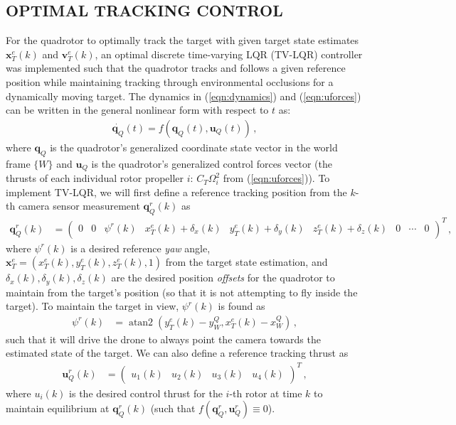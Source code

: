 \documentclass[11pt]{article}
\DeclareMathOperator{\atantwo}{atan2}
\begin{document}
\subsection{OPTIMAL TRACKING CONTROL}
For the quadrotor to optimally track the target with given target state estimates $\mathbf x_T^e(k)$ and $\mathbf v_T^e(k)$, an optimal discrete time-varying LQR (TV-LQR) controller was implemented such that the quadrotor tracks and follows a given reference position while maintaining tracking through environmental occlusions for a dynamically moving target. The dynamics in (\ref{eqn:dynamics}) and (\ref{eqn:uforces}) can be written in the general nonlinear form with respect to $t$ as:
\begin{align}\label{eqn:qdyn}
    \dot{\mathbf q_Q}(t)=f(\mathbf q_Q(t),\mathbf u_Q(t))\,,
\end{align}
where $\mathbf q_Q$ is the quadrotor's generalized coordinate state vector in the world frame $\{W\}$ and $\mathbf u_Q$ is the quadrotor's generalized control forces vector (the thrusts of each individual rotor propeller $i$: $C_T\Omega_i^2$ from (\ref{eqn:uforces})). To implement TV-LQR, we will first define a reference tracking position from the $k$-th camera sensor measurement $\mathbf q_Q^r(k)$ as
\begin{align}\label{eqn:qr}
    \mathbf q_Q^r(k)&=\begin{pmatrix}
        0 & 0 & \psi^r(k) & x_T^e(k)+\delta_x(k) & y_T^e(k)+\delta_y(k) & z_T^e(k)+\delta_z(k) & 0 & \cdots & 0
    \end{pmatrix}^T\,,
\end{align}
where $\psi^r(k)$ is a desired reference \textit{yaw} angle, $\mathbf x_T^e=(x_T^e(k),y_T^e(k),z_T^e(k),1)$ from the target state estimation, and $\delta_x(k),\delta_y(k),\delta_z(k)$ are the desired position \textit{offsets} for the quadrotor to maintain from the target's position (so that it is not attempting to fly inside the target). To maintain the target in view, $\psi^r(k)$ is found as
\begin{align*}
    \psi^r(k)&=\atantwo (y_T^e(k)-y_W^Q,x_T^e(k)-x_W^Q)\,,
\end{align*}
such that it will drive the drone to always point the camera towards the estimated state of the target. We can also define a reference tracking thrust as
\begin{align}\label{eqn:ur}
    \mathbf u_Q^r(k)&=\begin{pmatrix}
        u_1(k) & u_2(k) & u_3(k) & u_4(k)
    \end{pmatrix}^T\,,
\end{align}
where $u_i(k)$ is the desired control thrust for the $i$-th rotor at time $k$ to maintain equilibrium at $\mathbf q_Q^r(k)$ (such that $f(\mathbf q_Q^r,\mathbf u_Q^r)\equiv 0$).
\end{document}
